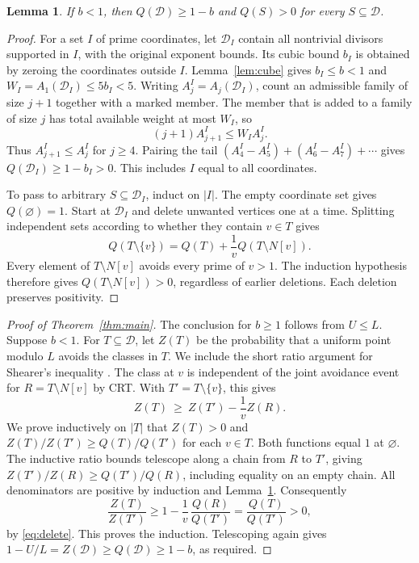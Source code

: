 \documentclass[11pt]{article}
\newtheorem{lemma}[theorem]{Lemma}
\newcommand{\D}{\mathcal D}
\begin{document}
\begin{lemma}\label{lem:pos}
If \(b<1\), then \(Q(\D)\geq1-b\) and \(Q(S)>0\) for every \(S\subseteq\D\).
\end{lemma}
\begin{proof}
For a set \(I\) of prime coordinates, let \(\D_I\) contain all
nontrivial divisors supported in \(I\), with the original exponent
bounds. Its cubic bound \(b_I\) is obtained by zeroing the coordinates
outside \(I\). Lemma~\ref{lem:cube} gives \(b_I\leq b<1\) and
\(W_I=A_1(\D_I)\leq5b_I<5\).
Writing \(A_j^I=A_j(\D_I)\), count an admissible family of size \(j+1\)
together with a marked member. The member that is added to a family of
size \(j\) has total available weight at most \(W_I\), so
\[
 (j+1)A_{j+1}^I\leq W_I A_j^I .
\]
Thus \(A_{j+1}^I\leq A_j^I\) for \(j\ge4\). Pairing the tail
\((A_4^I-A_5^I)+(A_6^I-A_7^I)+\cdots\) gives
\(Q(\D_I)\geq 1-b_I>0\). This includes \(I\) equal to all coordinates.

To pass to arbitrary \(S\subseteq\D_I\), induct on \(|I|\). The empty
coordinate set gives \(Q(\varnothing)=1\). Start at \(\D_I\) and delete
unwanted vertices one at a time. Splitting independent sets according to
whether they contain \(v\in T\) gives
\begin{equation}\label{eq:delete}
 Q(T\setminus\{v\})=Q(T)+\frac1v Q(T\setminus N[v]).
\end{equation}
Every element of \(T\setminus N[v]\) avoids every prime of \(v>1\).
The induction hypothesis therefore gives \(Q(T\setminus N[v])>0\),
regardless of earlier deletions. Each deletion preserves positivity.
\end{proof}

\begin{proof}[Proof of Theorem~\ref{thm:main}]
The conclusion for \(b\ge1\) follows from \(U\le L\). Suppose \(b<1\).
For \(T\subseteq\D\), let \(Z(T)\) be the probability that a uniform point
modulo \(L\) avoids the classes in \(T\). We include the short ratio
argument for Shearer's inequality \cite{shearer}. The class at \(v\)
is independent of the joint avoidance event for \(R=T\setminus N[v]\)
by CRT. With \(T'=T\setminus\{v\}\), this gives
\[
 Z(T)\ \geq\ Z(T')-\frac1v Z(R).
\]
We prove inductively on \(|T|\) that \(Z(T)>0\) and
\(Z(T)/Z(T')\geq Q(T)/Q(T')\) for each \(v\in T\).
Both functions equal \(1\) at \(\varnothing\). The inductive ratio bounds
telescope along a chain from \(R\) to \(T'\), giving
\(Z(T')/Z(R)\geq Q(T')/Q(R)\), including equality on an empty chain.
All denominators are positive by induction and Lemma~\ref{lem:pos}.
Consequently
\[
 \frac{Z(T)}{Z(T')}\geq 1-\frac1v\,\frac{Q(R)}{Q(T')}
   =\frac{Q(T)}{Q(T')}>0 ,
\]
by \eqref{eq:delete}. This proves the induction. Telescoping again gives
\(1-U/L=Z(\D)\geq Q(\D)\geq1-b\), as required.
\end{proof}
\end{document}
